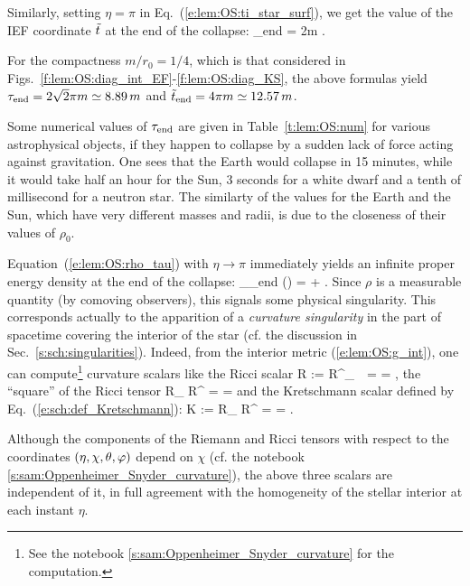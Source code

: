 Similarly, setting $\eta=\pi$ in Eq.~(\ref{e:lem:OS:ti_star_surf}), we get the value
of the IEF coordinate ${\tilde t}$ at the end of the collapse:
\be
     \ti_{\rm end} = 2m  .
\ee
\begin{example} \label{x:lem:OS:tau_end_plot}
For the compactness $m/r_0 = 1/4$, which is that considered in Figs.~\ref{f:lem:OS:diag_int_EF}-\ref{f:lem:OS:diag_KS}, the above formulas yield
$\tau_{\rm end} = 2 \sqrt{2} \pi m \simeq 8.89\, m$ and
${\tilde t}_{\rm end} = 4 \pi m \simeq 12.57\, m$.
\end{example}

\begin{example} \label{x:lem:OS:tau_end_astro}
Some numerical values of $\tau_{\rm end}$ are given in Table~\ref{t:lem:OS:num} for
various astrophysical objects, if they happen to collapse by a sudden lack
of force acting against gravitation. One sees that the Earth
would collapse in 15 minutes, while it would take half an hour for the Sun,
3 seconds for a white dwarf and a tenth of millisecond for a neutron star.
The similarty of the values for the Earth and the Sun, which have very different
masses and radii, is due to the closeness of their values of $\rho_0$.
\end{example}

Equation~(\ref{e:lem:OS:rho_tau}) with $\eta\to \pi$
immediately yields an infinite proper energy density at the end of the collapse:
\be
    \lim_{\tau\to\tau_{\rm end}} \rho(\tau) = + \infty.
\ee
Since $\rho$ is a measurable quantity (by comoving observers), this signals
some physical singularity.
This corresponds actually to the apparition of a \emph{curvature singularity}
in the part of spacetime covering the interior of the star (cf. the discussion
in Sec.~\ref{s:sch:singularities}).
Indeed, from the interior metric (\ref{e:lem:OS:g_int}), one can
compute\footnote{See the notebook \ref{s:sam:Oppenheimer_Snyder_curvature} for
the computation.} curvature scalars like the Ricci scalar
\be \label{e:lem:OS:Ricci_scal}
    R := R^\mu_{\ \, \mu} =  =  ,
\ee
the ``square'' of the Ricci tensor
\be \label{e:lem:OS:Ricci_squared}
    R_{\mu\nu} R^{\mu\nu} = 
    =  
\ee
and the Kretschmann
scalar defined by
Eq.~(\ref{e:sch:def_Kretschmann}):
\be \label{e:lem:OS:Kretschmann}
      K := R_{\mu\nu\rho\sigma} R^{\mu\nu\rho\sigma} = 
         =  .
\ee
\begin{remark}
Although the components of the Riemann and Ricci tensors with respect to the
coordinates $(\eta,\chi,\theta,\varphi)$ depend on $\chi$ (cf. the notebook \ref{s:sam:Oppenheimer_Snyder_curvature}),
the above three scalars are independent
of it, in full agreement with the homogeneity of the stellar interior at each
instant $\eta$.
\end{remark}

